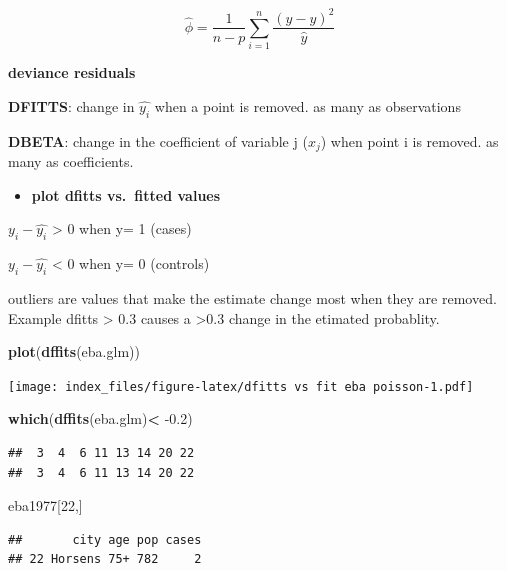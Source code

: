 \documentclass[
]{article}
\newenvironment{Shaded}{\begin{snugshade}}{\end{snugshade}}
\newcommand{\DecValTok}[1]{\textcolor[rgb]{0.00,0.00,0.81}{#1}}
\newcommand{\FloatTok}[1]{\textcolor[rgb]{0.00,0.00,0.81}{#1}}
\newcommand{\KeywordTok}[1]{\textcolor[rgb]{0.13,0.29,0.53}{\textbf{#1}}}
\newcommand{\NormalTok}[1]{#1}
\newcommand{\OperatorTok}[1]{\textcolor[rgb]{0.81,0.36,0.00}{\textbf{#1}}}
\newcommand{\StringTok}[1]{\textcolor[rgb]{0.31,0.60,0.02}{#1}}
\providecommand{\tightlist}{%
  \setlength{\itemsep}{0pt}\setlength{\parskip}{0pt}}
\begin{document}
\[\hat{\phi}=\frac{1}{n-p}\sum_{i=1}^n\frac{(y-\hat{y})^2}{\hat{y}}\]

\textbf{deviance residuals}

\textbf{DFITTS}: change in \(\hat{y_i}\) when a point is removed. as
many as observations

\textbf{DBETA}: change in the coefficient of variable j (\(x_j\)) when
point i is removed. as many as coefficients.

\begin{itemize}
\tightlist
\item
  \textbf{plot dfitts vs.~fitted values}
\end{itemize}

\(y_i- \hat{y_i}\) \textgreater{} 0 when y= 1 (cases)

\(y_i- \hat{y_i}\) \textless{} 0 when y= 0 (controls)

outliers are values that make the estimate change most when they are
removed. Example dfitts \textgreater{} 0.3 causes a \textgreater0.3
change in the etimated probablity.

\begin{Shaded}
\begin{Highlighting}[]
\KeywordTok{plot}\NormalTok{(}\KeywordTok{dffits}\NormalTok{(eba.glm))}
\end{Highlighting}
\end{Shaded}

\texttt{[image: index\_files/figure-latex/dfitts vs fit eba poisson-1.pdf]}

\begin{Shaded}
\begin{Highlighting}[]
\KeywordTok{which}\NormalTok{(}\KeywordTok{dffits}\NormalTok{(eba.glm)}\OperatorTok{<}\StringTok{ }\FloatTok{-0.2}\NormalTok{)}
\end{Highlighting}
\end{Shaded}

\begin{verbatim}
##  3  4  6 11 13 14 20 22 
##  3  4  6 11 13 14 20 22
\end{verbatim}

\begin{Shaded}
\begin{Highlighting}[]
\NormalTok{eba1977[}\DecValTok{22}\NormalTok{,]}
\end{Highlighting}
\end{Shaded}

\begin{verbatim}
##       city age pop cases
## 22 Horsens 75+ 782     2
\end{verbatim}
\end{document}
